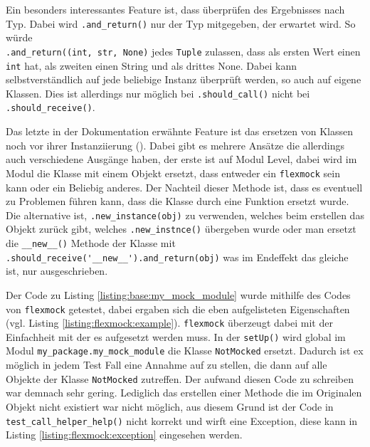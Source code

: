Ein besonders interessantes Feature ist, dass überprüfen des Ergebnisses nach
Typ. Dabei wird \lstinline{.and_return()} nur der Typ mitgegeben, der erwartet
wird. So würde
\\%
\lstinline{.and_return((int, str, None)} jedes \lstinline{Tuple}
zulassen, dass als ersten Wert einen \lstinline{int} hat, als zweiten einen
String und als drittes None. Dabei kann selbstverständlich auf jede beliebige
Instanz überprüft werden, so auch auf eigene Klassen. Dies ist allerdings nur
möglich bei \lstinline{.should_call()} nicht bei \lstinline{.should_receive()}.

Das letzte in der Dokumentation erwähnte Feature ist das ersetzen von Klassen
noch vor ihrer Instanziierung (\cite{flexmock:docs:0.10.3}). Dabei gibt es
mehrere Ansätze die allerdings auch verschiedene Ausgänge haben, der erste ist
auf Modul Level, dabei wird im Modul die Klasse mit einem Objekt ersetzt, dass
entweder ein \lstinline{flexmock} sein kann oder ein Beliebig anderes. Der
Nachteil dieser Methode ist, dass es eventuell zu Problemen führen kann, dass
die Klasse durch eine Funktion ersetzt wurde. Die alternative ist,
\lstinline{.new_instance(obj)} zu verwenden, welches beim erstellen das Objekt
zurück gibt, welches \lstinline{.new_instnce()} übergeben wurde oder man ersetzt
die \lstinline{__new__()} Methode der Klasse mit
\lstinline{.should_receive('__new__').and_return(obj)} was im Endeffekt das
gleiche ist, nur ausgeschrieben.
\newline

Der Code zu Listing \ref{listing:base:my_mock_module} wurde mithilfe des Codes
von \lstinline{flexmock} getestet, dabei ergaben sich die eben aufgelisteten
Eigenschaften (vgl. Listing \ref{listing:flexmock:example}).
\lstinline{flexmock} überzeugt dabei mit der Einfachheit mit der es aufgesetzt
werden muss. In der \lstinline{setUp()} wird global im Modul
\lstinline{my_package.my_mock_module} die Klasse \lstinline{NotMocked} ersetzt.
Dadurch ist ex möglich in jedem Test Fall eine Annahme auf zu stellen, die dann
auf alle Objekte der Klasse \lstinline{NotMocked} zutreffen. Der aufwand diesen
Code zu schreiben war demnach sehr gering. Lediglich das erstellen einer
Methode die im Originalen Objekt nicht existiert war nicht möglich, aus diesem
Grund ist der Code in \lstinline{test_call_helper_help()} nicht korrekt und
wirft eine Exception, diese kann in Listing \ref{listing:flexmock:exception}
eingesehen werden.
\newline

